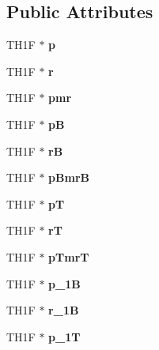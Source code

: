 \subsection*{Public Attributes}
\begin{DoxyCompactItemize}
\item 
\mbox{\label{classhists_a9e5ec4afae154aaa12652e1d4d8cc1bb}} 
T\+H1F $\ast$ {\bfseries p}
\item 
\mbox{\label{classhists_aff8415e0daed67934f5b5d22dc2833e9}} 
T\+H1F $\ast$ {\bfseries r}
\item 
\mbox{\label{classhists_a7deeb53d1622c43f1de1459c37554181}} 
T\+H1F $\ast$ {\bfseries pmr}
\item 
\mbox{\label{classhists_a830209b804679387c5e5c077468ba2f8}} 
T\+H1F $\ast$ {\bfseries pB}
\item 
\mbox{\label{classhists_ade9c18d36c628ca168263749aec46881}} 
T\+H1F $\ast$ {\bfseries rB}
\item 
\mbox{\label{classhists_a0ebe4e7e00a621e903d2badca471bb76}} 
T\+H1F $\ast$ {\bfseries p\+BmrB}
\item 
\mbox{\label{classhists_a4e95a9a76729e465681d69e532602237}} 
T\+H1F $\ast$ {\bfseries pT}
\item 
\mbox{\label{classhists_a61cf4fec0530bd16c881acc84a9f74d6}} 
T\+H1F $\ast$ {\bfseries rT}
\item 
\mbox{\label{classhists_a7e36a011237a42752b9f0e7b464925a8}} 
T\+H1F $\ast$ {\bfseries p\+TmrT}
\item 
\mbox{\label{classhists_a2619eb2b2d6c6498576388e9267b39dd}} 
T\+H1F $\ast$ {\bfseries p\+\_\+1B}
\item 
\mbox{\label{classhists_ad287fcf0e40907decc131b3bcbb7ff08}} 
T\+H1F $\ast$ {\bfseries r\+\_\+1B}
\item 
\mbox{\label{classhists_ab0877e25719159c845f5134b66d8ef57}} 
T\+H1F $\ast$ {\bfseries p\+\_\+1T}

\end{DoxyCompactItemize}
